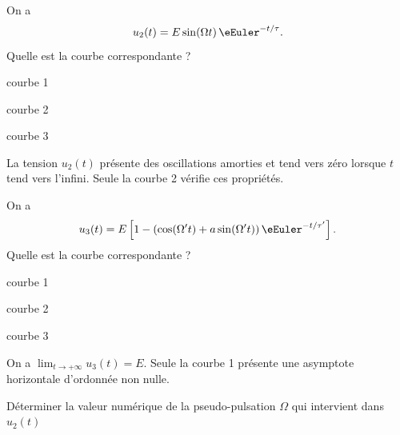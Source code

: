 

\begin{enonce}
On a 
\[
u_2(t)=E\sin(\Omega t)\,\eEuler^{-t/\tau}.
\] Quelle est la courbe correspondante ?
\begin{listeQCM3Colonnes}
\item courbe 1
\item courbe 2
\item courbe 3
\end{listeQCM3Colonnes}
\end{enonce}
\reponse{\reponseB}
\begin{corrige}
La tension $u_2(t)$ présente des oscillations amorties et tend vers zéro lorsque $t$ tend vers l'infini. Seule la courbe 2 vérifie ces propriétés.
\end{corrige}




\begin{enonce}
On a 
\[
u_3(t)=E\left[1 - \left(\cos(\Omega' t)+a\sin(\Omega't)\right)\eEuler^{-t/\tau'}\right].
\]
 Quelle est la courbe correspondante ?
\begin{listeQCM3Colonnes}
\item courbe 1
\item courbe 2
\item courbe 3
\end{listeQCM3Colonnes}
\end{enonce}

\reponse{\reponseA}

\begin{corrige}
On a $\lim_{t \to + \infty } u_3(t)=E$. Seule la courbe 1 présente une asymptote horizontale d'ordonnée non nulle.
\end{corrige}




\begin{enonce}
Déterminer la valeur numérique de la pseudo-pulsation $\Omega$ qui intervient dans $u_2(t)$

\end{enonce}

